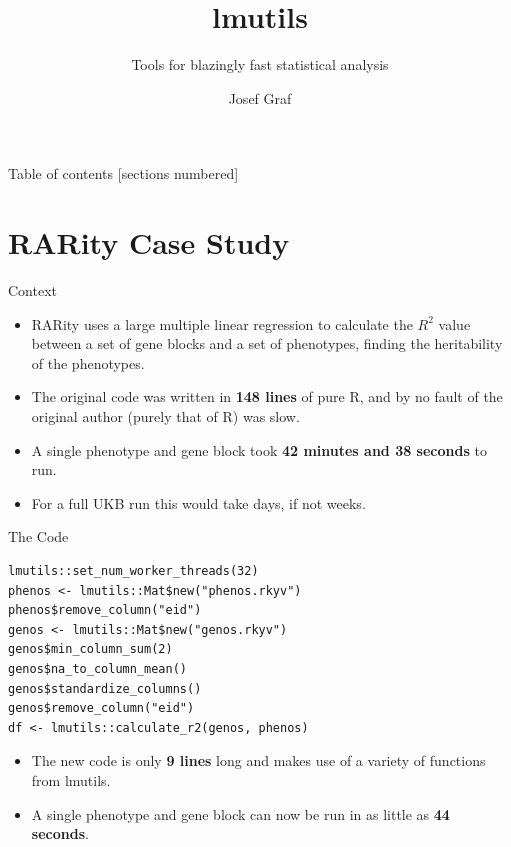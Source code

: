 \documentclass[10pt,handout]{beamer}
\title{lmutils}
\subtitle{Tools for blazingly fast statistical analysis}
\date{}
\author{Josef Graf}
\institute{Department of Computing and Software, McMaster University}
\begin{document}
\maketitle

\begin{frame}{Table of contents}
  [sections numbered]
  \tableofcontents%
\end{frame}

\section[RARity Case Study]{RARity Case Study}

\begin{frame}{Context}
  \begin{itemize}[<+->]
    \item RARity uses a large multiple linear regression to calculate the $R^2$ value between a set of gene blocks and a set of phenotypes, finding the heritability of the phenotypes.
    \item The original code was written in \textbf{148 lines} of pure R,
      and by no fault of the original author (purely that of R) was slow.
    \item A single phenotype and gene block took
      \textbf{42 minutes and 38 seconds} to run.
    \item For a full UKB run this would take days, if not weeks.
  \end{itemize}
\end{frame}

\begin{frame}[fragile]{The Code}
\begin{verbatim}
lmutils::set_num_worker_threads(32)
phenos <- lmutils::Mat$new("phenos.rkyv")
phenos$remove_column("eid")
genos <- lmutils::Mat$new("genos.rkyv")
genos$min_column_sum(2)
genos$na_to_column_mean()
genos$standardize_columns()
genos$remove_column("eid")
df <- lmutils::calculate_r2(genos, phenos)
\end{verbatim}
  \begin{itemize}
    \item<2-> The new code is only \textbf{9 lines} long and makes
      use of a variety of functions from lmutils.
    \item<3-> A single phenotype and gene block can now be run in
      as little as \textbf{44 seconds}.
  \end{itemize}
\end{frame}
\end{document}
